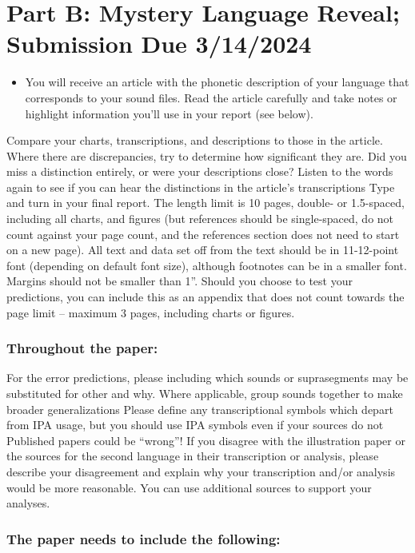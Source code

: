 \documentclass[12pt]{article}
\begin{document}
\section*{Part B: Mystery Language Reveal; Submission Due 3/14/2024}
\begin{itemize}
  \item You will receive an article with the phonetic description of your language that corresponds to your sound files.  Read the article carefully and take notes or highlight information you’ll use in your report (see below).
\end{itemize}
Compare your charts, transcriptions, and descriptions to those in the article.  Where there are discrepancies, try to determine how significant they are.  Did you miss a distinction entirely, or were your descriptions close?  Listen to the words again to see if you can hear the distinctions in the article’s transcriptions
Type and turn in your final report. The length limit is 10 pages, double- or 1.5-spaced, including all charts, and figures (but references should be single-spaced, do not count against your page count, and the references section does not need to start on a new page). All text and data set off from the text should be in 11-12-point font (depending on default font size), although footnotes can be in a smaller font. Margins should not be smaller than 1”. Should you choose to test your predictions, you can include this as an appendix that does not count towards the page limit – maximum 3 pages, including charts or figures.
\subsubsection*{Throughout the paper:}
For the error predictions, please including which sounds or suprasegments may be substituted for other and why. Where applicable, group sounds together to make broader generalizations
Please define any transcriptional symbols which depart from IPA usage, but you should use IPA symbols even if your sources do not
Published papers could be “wrong”! If you disagree with the illustration paper or the sources for the second language in their transcription or analysis, please describe your disagreement and explain why your transcription and/or analysis would be more reasonable. You can use additional sources to support your analyses.
\subsubsection*{The paper needs to include the following:}
\end{document}
